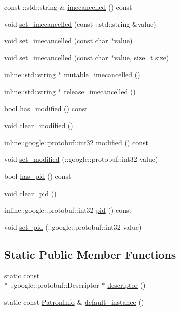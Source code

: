 \begin{DoxyCompactItemize}
const \-::std\-::string \& \hyperlink{classPatronInfo_a722cba9cd140b6a259f30d9fa801c389}{imecancelled} () const 
\item 
void \hyperlink{classPatronInfo_a81253c425ba9a744c3624b39a51e734f}{set\-\_\-imecancelled} (const \-::std\-::string \&value)
\item 
void \hyperlink{classPatronInfo_a8e79ca5a0b753483fd81eea1cbc7658d}{set\-\_\-imecancelled} (const char $\ast$value)
\item 
void \hyperlink{classPatronInfo_a502e7c1940a2f0180c51c103a73258c4}{set\-\_\-imecancelled} (const char $\ast$value, size\-\_\-t size)
\item 
inline\-::std\-::string $\ast$ \hyperlink{classPatronInfo_abe124a6af496fc466226acadd9132475}{mutable\-\_\-imecancelled} ()
\item 
inline\-::std\-::string $\ast$ \hyperlink{classPatronInfo_a2848b8cc6ab97628d3723d09299e7805}{release\-\_\-imecancelled} ()
\item 
bool \hyperlink{classPatronInfo_a9608a68e4c59ca31e166a4fc26154fe2}{has\-\_\-modified} () const 
\item 
void \hyperlink{classPatronInfo_aef259a399b72b1cd115e39db89177cad}{clear\-\_\-modified} ()
\item 
inline\-::google\-::protobuf\-::int32 \hyperlink{classPatronInfo_acfe17562ee7a7fc42fc1acb60ab8dbda}{modified} () const 
\item 
void \hyperlink{classPatronInfo_a7ef5a966ae4e626fd45217ba864a03cc}{set\-\_\-modified} (\-::google\-::protobuf\-::int32 value)
\item 
bool \hyperlink{classPatronInfo_a8c3b1322c28e04a7e79fd9944560b44d}{has\-\_\-pid} () const 
\item 
void \hyperlink{classPatronInfo_a4b6cbbc55ec66b3a78a4c0745e8b37b7}{clear\-\_\-pid} ()
\item 
inline\-::google\-::protobuf\-::int32 \hyperlink{classPatronInfo_a564fa2ea02f19047b56d9121b09ae861}{pid} () const 
\item 
void \hyperlink{classPatronInfo_a3a0ca794a0a34602c647d33a4e3d7ffc}{set\-\_\-pid} (\-::google\-::protobuf\-::int32 value)
\end{DoxyCompactItemize}
\subsection*{Static Public Member Functions}
\begin{DoxyCompactItemize}
\item 
static const \\*
\-::google\-::protobuf\-::\-Descriptor $\ast$ \hyperlink{classPatronInfo_a230f35e631fb4ae162d34bed192e0742}{descriptor} ()
\item 
static const \hyperlink{classPatronInfo}{Patron\-Info} \& \hyperlink{classPatronInfo_a03618b9b37175b4c8e35102d3dd2d03f}{default\-\_\-instance} ()
\end{DoxyCompactItemize}
